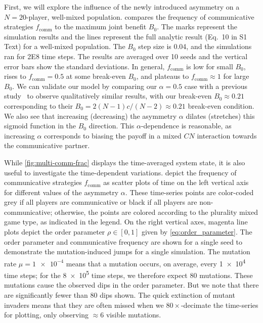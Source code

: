 \documentclass[10pt,letterpaper]{article}
\begin{document}
First, we will explore the influence of the newly introduced asymmetry
on a $N=20$-player, well-mixed population.
 compares the frequency of communicative strategies
$f_{\text{comm}}$ to the maximum joint benefit $B_0$.
The marks represent the simulation results
and the lines represent the full analytic
result (Eq.\ 10 in S1 Text) for a well-mixed population.
The $B_0$ step size is \num{0.04},
and the simulations ran for \num{2E8} time steps.
The results are averaged over 10 seeds
and the vertical error bars show the standard deviations.
In general, $f_{\text{comm}}$ is low for small $B_0$,
rises to $f_{\text{comm}} = 0.5$ at some break-even $B_0$,
and plateaus to $f_{\text{comm}} \approx 1$ for large $B_0$.
We can validate our model by comparing our
$\alpha = 0.5$ case with a previous study~\cite{tripp2022evolutionary}
to observe qualitatively similar results,
with our break-even $B_0 \approx 0.21$
corresponding to their $B_0 = 2 (N-1) c/(N-2) \approx 0.21$ break-even condition.
We also see that increasing (decreasing)
the asymmetry $\alpha$ dilates (stretches) this sigmoid function
in the $B_0$ direction.
This $\alpha$-dependence is reasonable,
as increasing $\alpha$ corresponds to biasing the payoff
in a mixed $CN$ interaction towards the communicative partner.

While \cref{fig:multi-comm-frac} displays
the time-averaged system state,
it is also useful to investigate the time-dependent variations.
depict the frequency
of communicative strategies $f_{\text{comm}}$
as scatter plots of time on the left vertical axis
for different values of the asymmetry $\alpha$.
These time-series points are color-coded
grey if all players are communicative or
black if all players are non-communicative;
otherwise, the points are colored according
to the plurality mixed game type, as indicated in the legend.
On the right vertical axes,
magenta line plots depict the order parameter
$\rho \in [0,1]$
given by \cref{eq:order_parameter}.
The order parameter and communicative frequency
are shown for a single seed to demonstrate the mutation-induced jumps
for a single simulation.
The mutation rate $\mu=\num{1e-4}$ means that a mutation occurs,
on average, every \num{1e4} time steps;
for the \num{8e5} time steps, we therefore expect \num{80} mutations.
These mutations cause the observed dips
in the order parameter.
But we note that there are significantly fewer than \num{80} dips
shown.
The quick extinction of mutant invaders
means that they are often missed when we $80\times$-decimate the time-series
for plotting,
only observing $\approx 6$ visible mutations.
\end{document}
